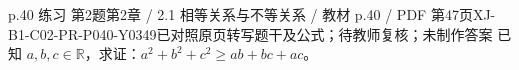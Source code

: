 \par\noindent\begin{minipage}{\linewidth}
\begin{bankitem}{p.40 练习 第2题}{第2章 / 2.1 相等关系与不等关系 / 教材 p.40 / PDF 第47页}{XJ-B1-C02-PR-P040-Y0349}{已对照原页转写题干及公式；待教师复核；未制作答案}
已知 $a,b,c\in\mathbb R$，求证：$a^2+b^2+c^2\ge ab+bc+ac$。
\end{bankitem}
\end{minipage}\par\medskip
